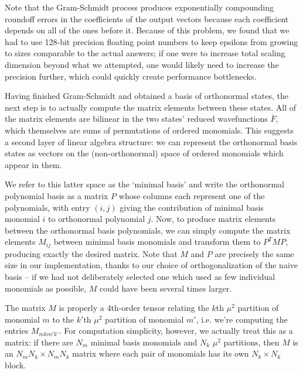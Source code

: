 \begin{subappendices}
Note that the Gram-Schmidt process produces exponentially compounding roundoff
errors in the coefficients of the output vectors because each coefficient 
depends on all of the ones before it. Because of this problem, we found that we
had to use 128-bit precision floating point numbers to keep epsilons from 
growing to sizes comparable to the actual answers; if one were to increase total 
scaling dimension beyond what we attempted, one would likely need to increase
the precision further, which could quickly create performance bottlenecks.

Having finished Gram-Schmidt and obtained a basis of orthonormal states, the
next step is to actually compute the matrix elements between these states. All
of the matrix elements are bilinear in the two states' reduced wavefunctions
$\bar F$, which themselves are sums of permutations of ordered monomials. This
suggests a second layer of linear algebra structure: we can represent the 
orthonormal basis states as vectors on the (non-orthonormal) space of ordered
monomials which appear in them. 

We refer to this latter space as the `minimal basis' and write the orthonormal 
polynomial basis as a matrix $P$ whose columns each represent one of the 
polynomials, with entry $(i,j)$ giving the contribution of minimal basis 
monomial $i$ to orthonormal polynomial $j$. Now, to produce matrix elements 
between the orthonormal basis polynomials, we can simply compute the matrix 
elements $M_{ij}$ between minimal basis monomials and transform them to 
$P^T M P$, producing exactly the desired matrix. Note that $M$ and $P$ are
precisely the same size in our implementation, thanks to our choice of
orthogonalization of the naive basis -- if we had not deliberately selected one 
which used as few individual monomials as possible, $M$ could have been several 
times larger.

The matrix $M$ is properly a 4th-order tensor relating the $k$th $\mu^2$ 
partition of monomial $m$ to the $k'$th $\mu^2$ partition of monomial $m'$, i.e.
we're computing the entries $M_{mkm'k'}$. For computation simplicity, however,
we actually treat this as a matrix: if there are $N_m$ minimal basis monomials
and $N_k$ $\mu^2$ partitions, then $M$ is an $N_m N_k \times N_m N_k$ matrix
where each pair of monomials has its own $N_k \times N_k$ block. 


\end{subappendices}

